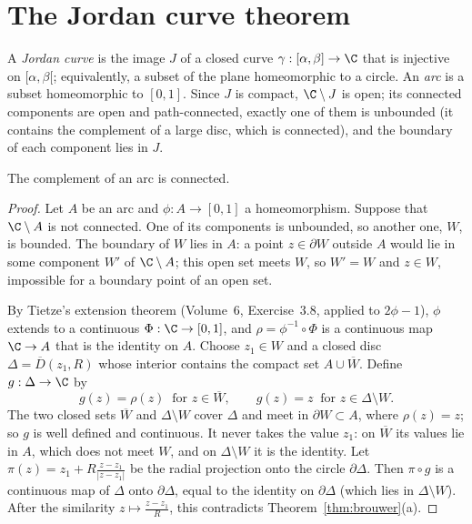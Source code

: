 \section{The Jordan curve theorem}

A \emph{Jordan curve} is the image $J$ of a closed curve $\gamma:[\alpha,\beta]\to\C$ that is injective on $[\alpha,\beta[$; equivalently, a subset of the plane homeomorphic to a circle. An
\emph{arc} is a subset homeomorphic to $[0,1]$. Since $J$ is compact, $\C\setminus J$ is open; its connected components are open and path-connected, exactly one of them is
unbounded (it contains the complement of a large disc, which is connected), and the boundary of each component lies in $J$.

\begin{lemma}\label{lem:arc}
The complement of an arc is connected.
\end{lemma}
\begin{proof}
Let $A$ be an arc and $\phi:A\to[0,1]$ a homeomorphism. Suppose that $\C\setminus A$ is not connected. One of its components is unbounded, so another one, $W$, is bounded. The boundary of
$W$ lies in $A$: a point $z\in\partial W$ outside $A$ would lie in some component $W'$ of $\C\setminus A$; this open set meets $W$, so $W'=W$ and $z\in W$, impossible for a boundary point of an open
set.

By Tietze's extension theorem (Volume~6, Exercise~3.8, applied to $2\phi-1$), $\phi$ extends to a continuous $\Phi:\C\to[0,1]$, and $\rho=\phi^{-1}\circ\Phi$ is a continuous map $\C\to A$ that is
the identity on $A$. Choose $z_1\in W$ and a closed disc $\Delta=\overline D(z_1,R)$ whose interior contains the compact set $A\cup\overline W$. Define $g:\Delta\to\C$ by
\[
g(z)=\rho(z)\ \text{ for }z\in\overline W,\qquad g(z)=z\ \text{ for }z\in\Delta\setminus W.
\]
The two closed sets $\overline W$ and $\Delta\setminus W$ cover $\Delta$ and meet in $\partial W\subset A$, where $\rho(z)=z$; so $g$ is well defined and continuous. It never takes the value $z_1$:
on $\overline W$ its values lie in $A$, which does not meet $W$, and on $\Delta\setminus W$ it is the identity. Let $\pi(z)=z_1+R\frac{z-z_1}{|z-z_1|}$ be the radial projection onto the circle
$\partial\Delta$. Then $\pi\circ g$ is a continuous map of $\Delta$ onto $\partial\Delta$, equal to the identity on $\partial\Delta$ (which lies in $\Delta\setminus W$). After the similarity
$z\mapsto\frac{z-z_1}R$, this contradicts Theorem~\ref{thm:brouwer}(a).
\end{proof}

